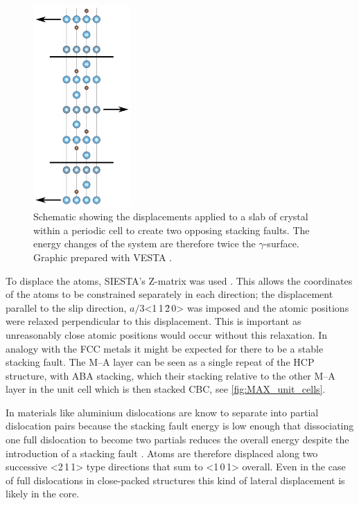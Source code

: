 \begin{figure}
\centering
\captionsetup{width=0.45\textwidth}
\includegraphics[width=0.3333\textwidth]{displacements_for_gamma_surface}
\caption[Schematic displacements during the simulation of the \texorpdfstring{$\gamma$}{gamma}-surface.]{Schematic showing the displacements applied to a slab of crystal within a periodic cell to create two opposing stacking faults. The energy changes of the system are therefore twice the $\gamma$-surface. Graphic prepared with VESTA \cite{Momma2011}.\label{fig:DFT_gamma_surface}}
\end{figure}

To displace the atoms, SIESTA's Z-matrix was used \cite{SIESTA_manual}. This allows the coordinates of the atoms to be constrained separately in each direction; the displacement parallel to the slip direction, $a/3$<1\,1\,\={2}\,0> was imposed and the atomic positions were relaxed perpendicular to this displacement. This is important as unreasonably close atomic positions would occur without this relaxation. In analogy with the FCC metals it might be expected for there to be a stable stacking fault. The M--A layer can be seen as a single repeat of the HCP structure, with ABA stacking, which their stacking relative to the other M--A layer in the unit cell which is then stacked CBC, see \autoref{fig:MAX_unit_cells}. 

In materials like aluminium dislocations are know to separate into partial dislocation pairs because the stacking fault energy is low enough that dissociating one full dislocation to become two partials reduces the overall energy despite the introduction of a stacking fault \cite{kelly2012ch9}. Atoms are therefore displaced along two successive <2\,1\,1> type directions that sum to <1\,0\,1> overall. Even in the case of full dislocations in close-packed structures this kind of lateral displacement is likely in the core. 

